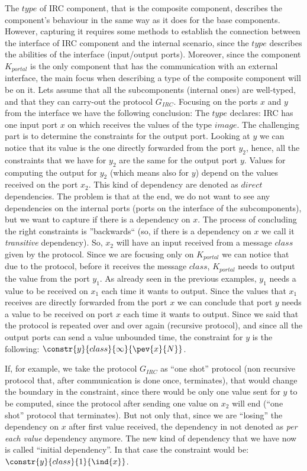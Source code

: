 The $type$ of IRC component, that is the composite component, describes the component's behaviour in the same way as it does for the base components. However, capturing it requires some methods to establish the connection between the interface of IRC component and the internal scenario, since the $type$ describes the abilities of the interface (input/output ports). 
Moreover, since the component $K_{portal}$ is the only component that has the communication with an external interface, the main focus when describing a type of the composite component will be on it. 
Lets assume that all the subcomponents (internal ones) are well-typed, and that they can carry-out the protocol $G_{IRC}$. Focusing on the ports $x$ and $y$ from the interface we have the following conclusion: The $type$ declares: IRC has one input port $x$ on which receives the values of the type $image$. The challenging part is to determine the constraints for the output port. Looking at $y$ we can notice that its value is the one directly forwarded from the port $y_2$, hence, all the constraints that we have for $y_2$ are the same for the output port $y$. Values for computing the output for $y_2 $ (which means also for $y$) depend on the values received on the port $x_2$. This kind of dependency are denoted as $direct$ dependencies. The problem is that at the end, we do not want to see any dependencies on the internal ports (ports on the interface of the subcomponents), but we want to capture if there is a dependency on $x$. The process of concluding the right constraints is ''backwards`` (so, if there is a dependency on $x$ we call it \textit{transitive} dependency). So, $x_2$ will have an input received from a message $class$ given by the protocol. Since we are focusing only on $K_{portal}$ we can notice that due to the protocol, before  it receives the message $class$, $K_{portal}$ needs to output the value from the port $y_1$. As already seen in the previous examples, $y_1$ needs a value to be received on $x_1$ each time it wants to output. Since the values that $x_1$ receives are directly forwarded from the port $x$ we can conclude that port $y$ needs a value to be received on port $x$ each time it wants to output. Since we said that the protocol is repeated over and over again (recursive protocol), and since all the output ports can send a value unbounded time, the constraint for $y$ is the following: $\constr{y}{class}{\infty}{\pev{x}{N}}$. 

If, for example, we take the protocol $G_{IRC}$ as ``one shot'' protocol (non recursive protocol that, after communication is done once, terminates), that would change the boundary in the constraint, since there would be only one value sent for $y$ to be computed, since the protocol after sending one value on $x_2$ will end (``one shot'' protocol that terminates). But not only that, since we are ``losing'' the dependency on $x$ after first value received, the dependency in not denoted as \textit{per each value} dependency anymore. The new kind of dependency that we have now is called ``initial dependency''. In that case the constraint would be: $\constr{y}{class}{1}{\ind{x}}$. 

